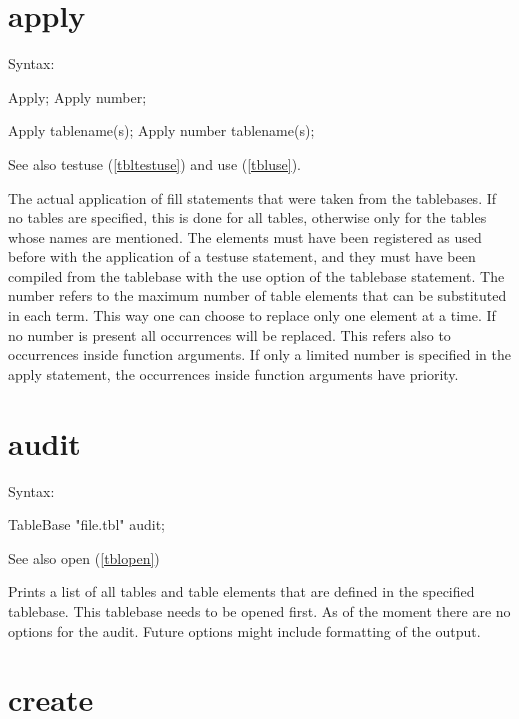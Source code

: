
\section{apply}
\label{tblapply}

\noindent Syntax:

Apply;
Apply number;

Apply tablename(s);
Apply number tablename(s);

\noindent See also testuse (\ref{tbltestuse}) and use (\ref{tbluse}).

\noindent The actual application of fill 
statements that were taken from the tablebases. If no tables are specified, 
this is done for all tables, otherwise only for the tables whose names are 
mentioned. The elements must have been registered as used before with the 
application of a testuse statement, and they must have been 
compiled from the tablebase with the use option of the tablebase 
statement. The number refers to the maximum number of table elements that 
can be substituted in each term. This way one can choose to replace only 
one element at a time. If no number is present all occurrences will be 
replaced. This refers also to occurrences inside function arguments. If only 
a limited number is specified in the apply statement, the occurrences 
inside function arguments have priority.


\section{audit}
\label{tblaudit}

\noindent Syntax:

TableBase "file.tbl" audit;

\noindent See also open (\ref{tblopen})

\noindent Prints a list of all tables and table elements that 
are defined in the specified tablebase. This tablebase needs to be opened 
first. As of the moment there are no options for the audit. Future options 
might include formatting of the output.


\section{create}
\label{tblcreate}

